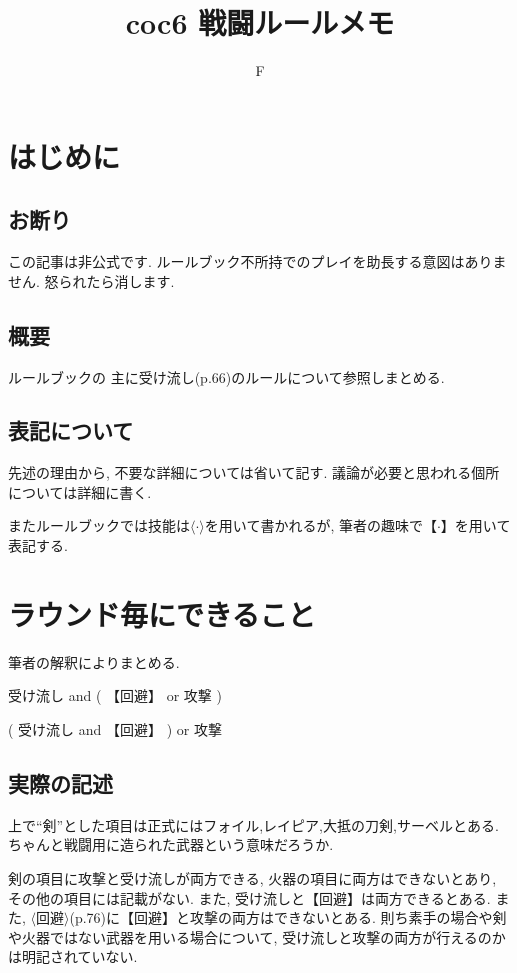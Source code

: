 \documentclass{jsarticle}
\title{coc6 戦闘ルールメモ}
\author{F}
\begin{document}
\maketitle
\section{はじめに}
\subsection*{お断り}
この記事は非公式です.
ルールブック\cite{1130282268636976512}不所持でのプレイを助長する意図はありません.
怒られたら消します.

\subsection*{概要}
ルールブック\cite{1130282268636976512}の
主に受け流し(p.66)のルールについて参照しまとめる.

\subsection*{表記について}
先述の理由から,
不要な詳細については省いて記す.
議論が必要と思われる個所については詳細に書く.

またルールブックでは技能は$\langle\cdot\rangle$を用いて書かれるが,
筆者の趣味で【$\cdot$】を用いて表記する.


\section{ラウンド毎にできること}
筆者の解釈によりまとめる.
\begin{description}[labelwidth=10em]
    \item[剣
    を持っている場合]
        受け流し and ( 【回避】 or 攻撃 )
    \item[その他]
        ( 受け流し and 【回避】 ) or 攻撃
\end{description}
\subsection*{実際の記述}
上で``剣''とした項目は正式にはフォイル,レイピア,大抵の刀剣,サーベルとある.
ちゃんと戦闘用に造られた武器という意味だろうか.

剣の項目に攻撃と受け流しが両方できる,
火器の項目に両方はできないとあり,
その他の項目には記載がない.
また,
受け流しと【回避】は両方できるとある.
また,
$\langle\mbox{回避}\rangle$(p.76)に【回避】と攻撃の両方はできないとある.
則ち素手の場合や剣や火器ではない武器を用いる場合について,
受け流しと攻撃の両方が行えるのかは明記されていない.
\end{document}
